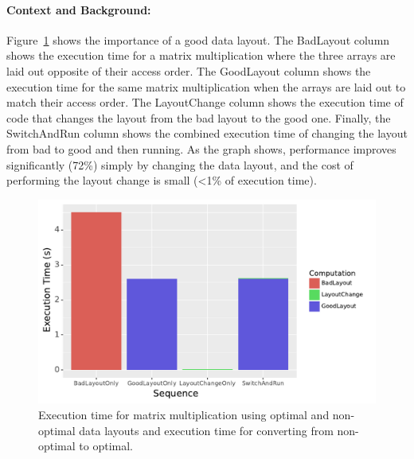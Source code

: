 \documentclass{article}
\begin{document}
\paragraph{Context and Background:}

Figure~\ref{DataLayoutImportance} shows the importance of a good data layout. 
The BadLayout column shows the execution time for a matrix multiplication where the three arrays are laid out opposite of their access order. 
The GoodLayout column shows the execution time for the same matrix multiplication when the arrays are laid out to match their access order.
The LayoutChange column shows the execution time of code that changes the layout from the bad layout to the good one.
Finally, the SwitchAndRun column shows the combined execution time of changing the layout from bad to good and then running.
As the graph shows, performance improves  significantly (72\%) simply by changing the data layout, and the cost of performing the layout change is small (<1\% of execution time). 


\begin{figure}
	\includegraphics[width=\columnwidth]{IntroExampleGraph.pdf}
	\caption{Execution time for matrix multiplication using optimal and non-optimal data layouts and execution time for converting from non-optimal to optimal.}
	\label{DataLayoutImportance}
\end{figure}
\end{document}
